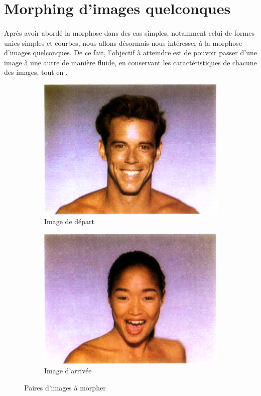 \section{Morphing d'images quelconques}
\label{sec:morphing_images}

\paragraph{} Après avoir abordé la morphose dans des cas simples, notamment celui de formes unies simples et courbes, 
nous allons désormais nous intéresser à la morphose d'images quelconques. De ce fait, l'objectif à atteindre est de pouvoir
passer d'une image à une autre de manière fluide, en conservant les caractéristiques de chacune des images, tout en .

\begin{figure}[h!]
    \centering
    \begin{subfigure}{0.4\textwidth}
        \centering
        \includegraphics[width=0.8\linewidth]{img/p3/lena.png}
        \caption{Image de départ}
        \label{fig:lena}
    \end{subfigure}
    \begin{subfigure}{0.4\textwidth}
        \centering
        \includegraphics[width=0.8\linewidth]{img/p3/lena2.png}
        \caption{Image d'arrivée}
        \label{fig:lena2}
    \end{subfigure}
    \caption{Paires d'images à morpher \cite{beier1992feature}}
\end{figure}

